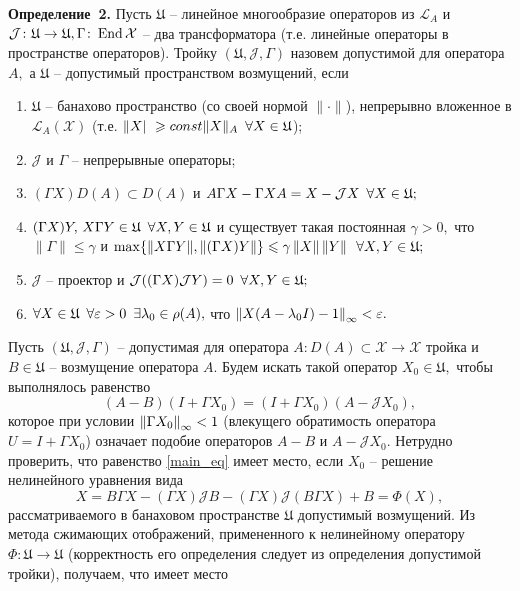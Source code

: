\textbf{Определение~2.}
Пусть $\mathfrak{U}$ -- линейное многообразие операторов из $\mathcal{L}_A$ и $\mathcal{J} \colon \mathfrak{U}\to \mathfrak{U}, \Gamma \colon \operatorname{End}\mathcal{X}$ -- два трансформатора (т.е. линейные операторы в пространстве операторов). Тройку $(\mathfrak{U}, \mathcal{J}, \Gamma)$ назовем допустимой для оператора $A,$ а $\mathfrak{U}$ -- допустимый пространством возмущений, если 
\begin{enumerate}
\item $\mathfrak{U}$ -- банахово пространство (со своей нормой $\| \cdot \|$), непрерывно вложенное в $\mathcal{L}_A(\mathcal{X})$ (т.е. $\| X |\ \geqslant const\| X \|_A \enskip \forall X \in \mathfrak{U}$);
\item $\mathcal{J}$ и $\Gamma$ -- непрерывные операторы;
\item $(\Gamma X)D(A) \subset D(A)$ и $A\Gamma X - \Gamma X A = X - \mathcal{J} X \enskip \forall X  \in \mathfrak{U};$
\item $(\Gamma X)Y, \, X\Gamma Y \in \mathfrak{U} \enskip \forall X, Y \in \mathfrak{U}$ и существует такая постоянная $\gamma > 0,$ что $\| \Gamma \| \leqslant \gamma$ и $\max \{ \| X\Gamma Y \|, \| (\Gamma X)Y \| \} \leqslant \gamma \left\|X\right\| \left\|Y\right\| \enskip \forall X, Y \in \mathfrak{U};$
\item $\mathcal{J}$ -- проектор и $\mathcal{J}((\Gamma X)\mathcal{J} Y) = 0 \enskip \forall X, Y \in \mathfrak{U};$
\item $\forall X \in \mathfrak{U} \enskip \forall \varepsilon > 0 \enskip \exists \lambda_0 \in \rho (A),$ что $\left\|X(A - \lambda_0I)-1\right\|_\infty < \varepsilon.$ 
\end{enumerate}

Пусть $(\mathfrak{U}, \mathcal{J}, \Gamma)$ -- допустимая для оператора $A \colon D(A) \subset \mathcal{X} \to \mathcal{X}$ тройка и $B \in \mathfrak{U}$ -- возмущение оператора $A.$ Будем искать такой оператор $X_0 \in \mathfrak{U},$ чтобы выполнялось равенство
\begin{equation}
(A - B)(I + \Gamma X_0) = (I + \Gamma X_0)(A - \mathcal{J} X_0),
\label{main_eq}
\end{equation}
которое при условии $\left\|\Gamma X_0\right\|_\infty < 1$ (влекущего обратимость оператора \linebreak ${U = I + \Gamma X_0}$) означает подобие операторов $A - B$ и $A - \mathcal{J} X_0.$ Нетрудно проверить, что равенство \eqref{main_eq} имеет место, если $X_0$ -- решение нелинейного уравнения вида
\begin{equation}\label{eq:x_main}
	X = B\Gamma X - (\Gamma X) \mathcal{J} B - (\Gamma X) \mathcal{J}(B\Gamma X) + B = \Phi(X),
\end{equation} 
рассматриваемого в банаховом пространстве $\mathfrak{U}$ допустимый возмущений. Из метода сжимающих отображений, примененного к нелинейному оператору $\Phi \colon \mathfrak{U} \to \mathfrak{U}$ (корректность его определения следует из определения допустимой тройки), получаем, что имеет место

